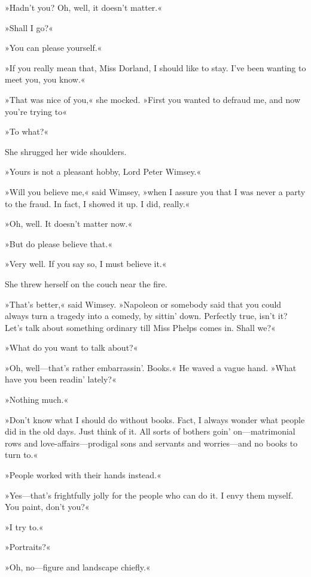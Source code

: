 »Hadn't you? Oh, well, it doesn't matter.«

»Shall I go?«

»You can please yourself.«

»If you really mean that, Miss Dorland, I should like to stay. I've been wanting to meet you, you know.«

»That was nice of you,« she mocked. »First you wanted to defraud me, and now you're trying to\longdash«

»To what?«

She shrugged her wide shoulders.

»Yours is not a pleasant hobby, Lord Peter Wimsey.«

»Will you believe me,« said Wimsey, »when I assure you that I was never a party to the fraud. In fact, I showed it up. I did, really.«

»Oh, well. It doesn't matter now.«

»But do please believe that.«

»Very well. If you say so, I must believe it.«

She threw herself on the couch near the fire.

»That's better,« said Wimsey. »Napoleon or somebody said that you could always turn a tragedy into a comedy, by sittin' down. Perfectly true, isn't it? Let's talk about something ordinary till Miss Phelps comes in. Shall we?«

»What do you want to talk about?«

»Oh, well\allowbreak---\allowbreak that's rather embarrassin'. Books.« He waved a vague hand. »What have you been readin' lately?«

»Nothing much.«

»Don't know what I should do without books. Fact, I always wonder what people did in the old days. Just think of it. All sorts of bothers goin' on\allowbreak---\allowbreak matrimonial rows and love-affairs\allowbreak---\allowbreak prodigal sons and servants and worries\allowbreak---\allowbreak and no books to turn to.«

»People worked with their hands instead.«

»Yes\allowbreak---\allowbreak that's frightfully jolly for the people who can do it. I envy them myself. You paint, don't you?«

»I try to.«

»Portraits?«

»Oh, no\allowbreak---\allowbreak figure and landscape chiefly.«

